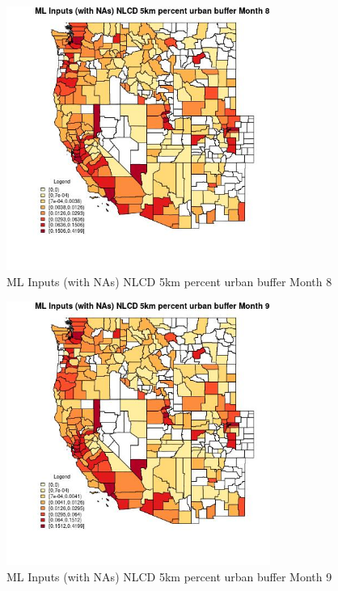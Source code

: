 \begin{figure} 
\centering  
\includegraphics[width=0.77\textwidth]{Code_Outputs/Report_ML_input_PM25_Step4_part_f_de_duplicated_aves_prioritize_24hr_obswNAs_CountyNLCD_5km_percent_urban_buffermedianMonth8.jpg} 
\caption{\label{fig:Report_ML_input_PM25_Step4_part_f_de_duplicated_aves_prioritize_24hr_obswNAsCountyNLCD_5km_percent_urban_buffermedianMonth8}ML Inputs (with NAs) NLCD 5km percent urban buffer Month 8} 
\end{figure} 
 

\clearpage 

\begin{figure} 
\centering  
\includegraphics[width=0.77\textwidth]{Code_Outputs/Report_ML_input_PM25_Step4_part_f_de_duplicated_aves_prioritize_24hr_obswNAs_CountyNLCD_5km_percent_urban_buffermedianMonth9.jpg} 
\caption{\label{fig:Report_ML_input_PM25_Step4_part_f_de_duplicated_aves_prioritize_24hr_obswNAsCountyNLCD_5km_percent_urban_buffermedianMonth9}ML Inputs (with NAs) NLCD 5km percent urban buffer Month 9} 
\end{figure} 
 

